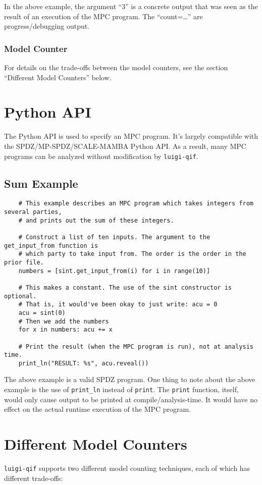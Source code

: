 \documentclass[11pt]{article}
\begin{document}
In the above example, the argument ``3'' is a concrete output that was seen as the result of an execution of the MPC program. The ``count=\ldots'' are progress/debugging output.

\subsubsection*{Model Counter}
For details on the trade-offs between the model counters, see the section ``Different Model Counters'' below.

\section{Python API}
The Python API is used to specify an MPC program. It's largely compatible with the SPDZ/MP-SPDZ/SCALE-MAMBA Python API. As a result, many MPC programs can be analyzed without modification by \texttt{luigi-qif}.

\subsection{Sum Example}
\begin{verbatim}
    # This example describes an MPC program which takes integers from several parties,
    # and prints out the sum of these integers.
    
    # Construct a list of ten inputs. The argument to the get_input_from function is
    # which party to take input from. The order is the order in the prior file.
    numbers = [sint.get_input_from(i) for i in range(10)]

    # This makes a constant. The use of the sint constructor is optional.
    # That is, it would've been okay to just write: acu = 0
    acu = sint(0)
    # Then we add the numbers
    for x in numbers: acu += x

    # Print the result (when the MPC program is run), not at analysis time.
    print_ln("RESULT: %s", acu.reveal())
\end{verbatim}

The above example is a valid SPDZ program. One thing to note about the above example is the use of \texttt{print\_ln} instead of \texttt{print}. The \texttt{print} function, itself, would only cause output to be printed at compile/analysis-time. It would have no effect on the actual runtime execution of the MPC program.

\section{Different Model Counters}
\texttt{luigi-qif} supports two different model counting techniques, each of which has different trade-offs:
\end{document}
